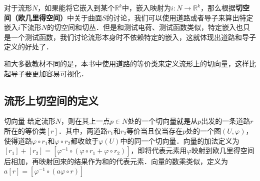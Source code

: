 
对于流形$N$，如果能将它嵌入到某个$\mathbb{R}^k$中，嵌入映射为$i:N\rightarrow\mathbb{R}^k$，那么根据\textbf{切空间（欧几里得空间）}中关于曲面$S$的讨论，我们可以使用道路或者导子来算出特定嵌入$i$下流形$N$的切空间和切丛．但是和测试电荷、测试函数类似，特定嵌入也只是一个测试函数，我们讨论流形本身时不依赖特定的嵌入，这就体现出道路和导子定义的好处了．

和大多数教材不同的是，本书中使用道路的等价类来定义流形上的切向量，这样比起导子要更加容易可视化．

\subsection{流形上切空间的定义}

\begin{definition}{切向量}
给定流形$N$，则在其上一点$p\in N$处的一个切向量就是从$p$出发的一条道路$r$所在的等价类$[r]$．其中，两道路$r_1$和$r_2$等价当且仅当存在$p$处的一个图$(U, \varphi)$，使得道路$\varphi\circ r_1$和$\varphi\circ r_2$都收敛于$\varphi(U)$中的同一个切向量．向量的加法定义为$[r_1]+[r_2]=[\varphi^{-1}\circ(\varphi\circ r_1+\varphi\circ r_2)]$，即将代表元素用$\varphi$映射到欧几里得空间后相加，再映射回来的结果作为和的代表元素．向量的数乘类似，定义为$a[r]=[\varphi^{-1}\circ(a\varphi\circ r)]$
\end{definition}





